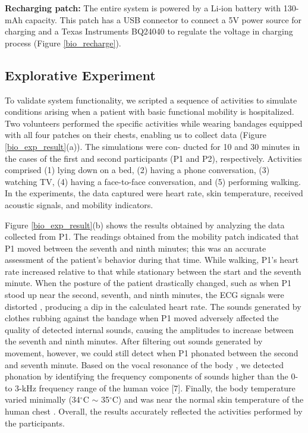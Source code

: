\newline
\textbf{Recharging patch:}
\newline
The entire system is powered by a Li-ion battery with 130-mAh capacity. This patch has a USB connector to connect a 5V power source for charging and a Texas Instruments BQ24040 to regulate the voltage in charging process (Figure \ref{bio_recharge}).


\subsection{Explorative Experiment}
To validate system functionality, we scripted a sequence of activities to simulate conditions arising when a patient with basic functional mobility is hospitalized. Two volunteers performed the specific activities while wearing bandages equipped with all four patches on their chests, enabling us to collect data (Figure \ref{bio_exp_result}(a)). The simulations were con- ducted for 10 and 30 minutes in the cases of the first and second participants (P1 and P2), respectively. Activities comprised (1) lying down on a bed, (2) having a phone conversation, (3) watching TV, (4) having a face-to-face conversation, and (5) performing walking. In the experiments, the data captured were heart rate, skin temperature, received acoustic signals, and mobility indicators.

Figure \ref{bio_exp_result}(b) shows the results obtained by analyzing the data collected from P1. The readings obtained from the mobility patch indicated that P1 moved between the seventh and ninth minutes; this was an accurate assessment of the patient's behavior during that time. While walking, P1's heart rate increased relative to that while stationary between the start and the seventh minute. When the posture of the patient drastically changed, such as when P1 stood up near the second, seventh, and ninth minutes, the ECG signals were distorted \cite{chan2013}, producing a dip in the calculated heart rate. The sounds generated by clothes rubbing against the bandage when P1 moved adversely affected the quality of detected internal sounds, causing the amplitudes to increase between the seventh and ninth minutes. After filtering out sounds generated by movement, however, we could still detect when P1 phonated between the second and seventh minute. Based on the vocal resonance of the body \cite{Dacre2002}, we detected phonation by identifying the frequency components of sounds higher than the 0- to 3-kHz frequency range of the human voice [7]. Finally, the body temperature varied minimally (34$^{\circ}$C $\sim$ 35$^{\circ}$C) and was near the normal skin temperature of the human chest \cite{Freitas1999}. Overall, the results accurately reflected the activities performed by the participants.

